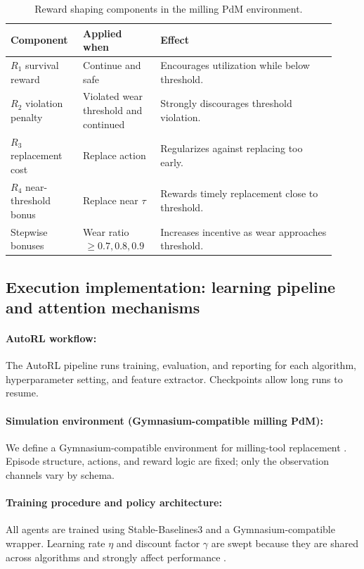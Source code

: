 \documentclass[sn-basic]{sn-jnl}%
\begin{document}
\begin{table}[htbp]
	\centering
	\caption{Reward shaping components in the milling PdM environment.}
	\label{tab:reward_components}
	\begin{tabular}{L{0.20\linewidth} L{0.22\linewidth} L{0.50\linewidth}}
		\toprule
		\textbf{Component} & \textbf{Applied when} & \textbf{Effect}\\
		\midrule
		$R_1$ survival reward & Continue and safe & Encourages utilization while below threshold.\\
		$R_2$ violation penalty & Violated wear threshold and continued & Strongly discourages threshold violation.\\
		$R_3$ replacement cost & Replace action & Regularizes against replacing too early.\\
		$R_4$ near-threshold bonus & Replace near $\tau$ & Rewards timely replacement close to threshold.\\
		Stepwise bonuses & Wear ratio $\,\ge 0.7, 0.8, 0.9$ & Increases incentive as wear approaches threshold.\\
		\bottomrule
	\end{tabular}
\end{table}

\subsection{Execution implementation: learning pipeline and attention mechanisms}\label{sec:algo_desc}
\paragraph{AutoRL workflow:}\label{sec:autorl}
The AutoRL pipeline runs training, evaluation, and reporting for each algorithm, hyperparameter setting, and feature extractor. Checkpoints allow long runs to resume.

\paragraph{Simulation environment (Gymnasium-compatible milling PdM):}
We define a Gymnasium-compatible environment for milling-tool replacement \cite{Foundation2023}. Episode structure, actions, and reward logic are fixed; only the observation channels vary by schema.

\paragraph{Training procedure and policy architecture:}
All agents are trained using Stable-Baselines3 and a Gymnasium-compatible wrapper. Learning rate $\eta$ and discount factor $\gamma$ are swept because they are shared across algorithms and strongly affect performance \cite{Henderson2019, Shala2022AutoRL, Eimer2023}.
  
\end{document}
